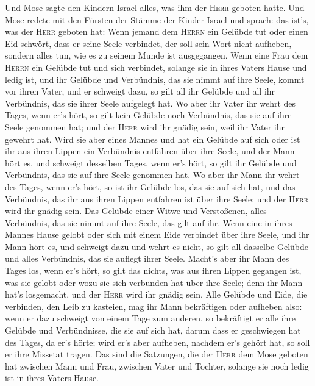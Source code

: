 Und Mose sagte den Kindern Israel alles, was ihm der
\textsc{Herr} geboten hatte.  Und Mose redete mit den
Fürsten der Stämme der Kinder Israel und sprach: das ist's, was der
\textsc{Herr} geboten hat:  Wenn jemand dem \textsc{Herrn}
ein Gelübde tut oder einen Eid schwört, dass er seine Seele verbindet,
der soll sein Wort nicht aufheben, sondern alles tun, wie es zu seinem
Munde ist ausgegangen.  Wenn eine Frau dem \textsc{Herrn}
ein Gelübde tut und sich verbindet, solange sie in ihres Vaters Hause
und ledig ist,  und ihr Gelübde und Verbündnis, das sie
nimmt auf ihre Seele, kommt vor ihren Vater, und er schweigt dazu, so
gilt all ihr Gelübde und all ihr Verbündnis, das sie ihrer Seele
aufgelegt hat.  Wo aber ihr Vater ihr wehrt des Tages,
wenn er's hört, so gilt kein Gelübde noch Verbündnis, das sie auf ihre
Seele genommen hat; und der \textsc{Herr} wird ihr gnädig sein, weil ihr
Vater ihr gewehrt hat.  Wird sie aber eines Mannes und hat
ein Gelübde auf sich oder ist ihr aus ihren Lippen ein Verbündnis
entfahren über ihre Seele,  und der Mann hört es, und
schweigt desselben Tages, wenn er's hört, so gilt ihr Gelübde und
Verbündnis, das sie auf ihre Seele genommen hat.  Wo aber
ihr Mann ihr wehrt des Tages, wenn er's hört, so ist ihr Gelübde los,
das sie auf sich hat, und das Verbündnis, das ihr aus ihren Lippen
entfahren ist über ihre Seele; und der \textsc{Herr} wird ihr gnädig
sein.  Das Gelübde einer Witwe und Verstoßenen, alles
Verbündnis, das sie nimmt auf ihre Seele, das gilt auf ihr.
 Wenn eine in ihres Mannes Hause gelobt oder sich mit
einem Eide verbindet über ihre Seele,  und ihr Mann hört
es, und schweigt dazu und wehrt es nicht, so gilt all dasselbe Gelübde
und alles Verbündnis, das sie auflegt ihrer Seele. 
Macht's aber ihr Mann des Tages los, wenn er's hört, so gilt das nichts,
was aus ihren Lippen gegangen ist, was sie gelobt oder wozu sie sich
verbunden hat über ihre Seele; denn ihr Mann hat's losgemacht, und der
\textsc{Herr} wird ihr gnädig sein.  Alle Gelübde und
Eide, die verbinden, den Leib zu kasteien, mag ihr Mann bekräftigen oder
aufheben also:  wenn er dazu schweigt von einem Tage zum
anderen, so bekräftigt er alle ihre Gelübde und Verbündnisse, die sie
auf sich hat, darum dass er geschwiegen hat des Tages, da er's hörte;
 wird er's aber aufheben, nachdem er's gehört hat, so
soll er ihre Missetat tragen.  Das sind die Satzungen,
die der \textsc{Herr} dem Mose geboten hat zwischen Mann und Frau,
zwischen Vater und Tochter, solange sie noch ledig ist in ihres Vaters
Hause.

